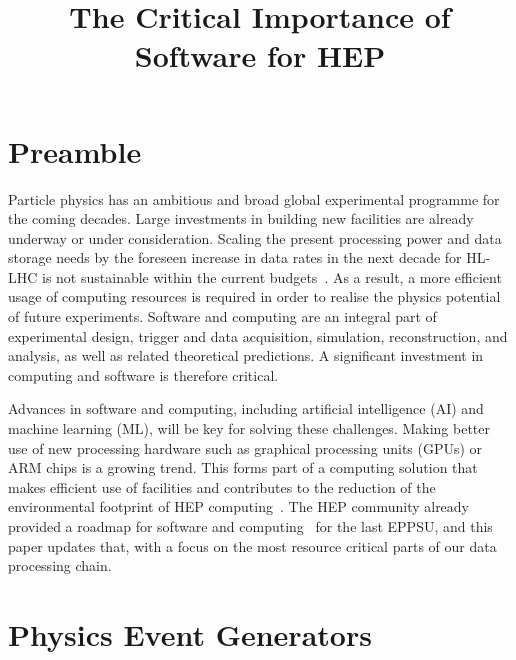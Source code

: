 \documentclass[10pt,a4paper]{article}
\begin{document}

\title{The Critical Importance of Software for HEP}

\maketitle


\newpage

\setcounter{page}{1}

\section{Preamble}\label{preamble}

Particle physics has an ambitious and broad global experimental programme for
the coming decades. Large investments in building new facilities are already
underway or under consideration. Scaling the present processing power and data
storage needs by the foreseen increase in data rates in the next decade for
HL-LHC is not sustainable within the current
budgets~\cite{CERN-LHCC-2022-005,Software:2815292}. As a result, a more
efficient usage of computing resources is required in order to realise the
physics potential of future experiments. Software and computing are an integral
part of experimental design, trigger and data acquisition, simulation,
reconstruction, and analysis, as well as related theoretical predictions. A
significant investment in computing and software is therefore critical.

Advances in software and computing, including artificial intelligence (AI) and
machine learning (ML), will be key for solving these challenges. Making better
use of new processing hardware such as graphical processing units (GPUs) or ARM
chips is a growing trend. This forms part of a computing solution that makes
efficient use of facilities and contributes to the reduction of the
environmental footprint of HEP computing~\cite{wlcgsust}. The HEP community
already provided a roadmap for software and computing~\cite{hsfcwp} for the last
EPPSU, and this paper updates that, with a focus on the most resource critical
parts of our data processing chain.

\section{Physics Event Generators}\label{physics-event-generators}
\end{document}
